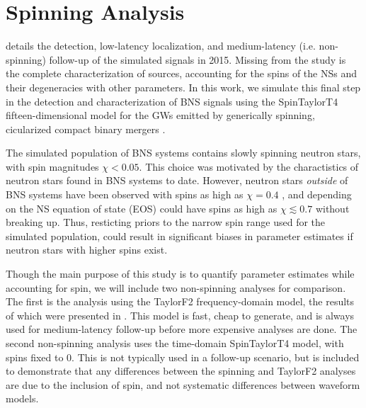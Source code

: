 \section{Spinning Analysis}
\label{sec:spin}

\citet{Singer_2014} details the detection, low-latency localization, and medium-latency (i.e. non-spinning) follow-up of the simulated signals in 2015.  Missing from the study is the complete characterization of sources, accounting for the spins of the NSs and their degeneracies with other parameters.  In this work, we simulate this final step in the detection and characterization of BNS signals using the SpinTaylorT4 fifteen-dimensional model for the GWs emitted by generically spinning, cicularized compact binary mergers \citep{Buonanno_2003,Buonanno_2009}.

The simulated population of BNS systems contains slowly spinning neutron stars, with spin magnitudes $\chi < 0.05$.  This choice was motivated by the charactistics of neutron stars found in BNS systems to date. However, neutron stars \emph{outside} of BNS systems have been observed with spins as high as $\chi = 0.4$ \citep{Hessels_2006,Brown_2012}, and depending on the NS equation of state (EOS) could have spins as high as $\chi \lesssim 0.7$ \citep{Lo_2011} without breaking up.  Thus, resticting priors to the narrow spin range used for the simulated population, could result in significant biases in parameter estimates if neutron stars with higher spins exist.

Though the main purpose of this study is to quantify parameter estimates while accounting for spin, we will include two non-spinning analyses for comparison.  The first is the analysis using the TaylorF2 frequency-domain model, the results of which were presented in \citet{Singer_2014}.  This model is fast, cheap to generate, and is always used for medium-latency follow-up before more expensive analyses are done.  The second non-spinning analysis uses the time-domain SpinTaylorT4 model, with spins fixed to $0$.  This is not typically used in a follow-up scenario, but is included to demonstrate that any differences between the spinning and TaylorF2 analyses are due to the inclusion of spin, and not systematic differences between waveform models.

